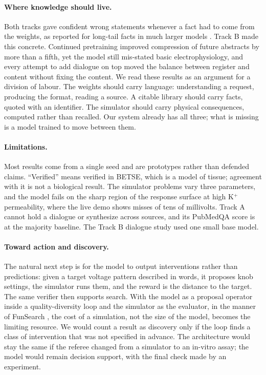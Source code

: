 \documentclass[11pt]{article}
\begin{document}
\paragraph{Where knowledge should live.} Both tracks gave confident wrong
statements whenever a fact had to come from the weights, as reported for
long-tail facts in much larger models \citep{kandpal2023large,mallen2023when}.
Track B made this concrete. Continued pretraining improved compression of
future abstracts by more than a fifth, yet the model still mis-stated basic
electrophysiology, and every attempt to add dialogue on top moved the
balance between register and content without fixing the content. We read
these results as an argument for a division of labour. The weights should
carry language: understanding a request, producing the format,
reading a source. A citable library should carry facts, quoted with an
identifier. The simulator should carry physical consequences, computed
rather than recalled. Our system already has all three; what is missing is
a model trained to move between them.

\paragraph{Limitations.} Most results come from a single seed and are
prototypes rather than defended claims. ``Verified'' means verified in
BETSE, which is a model of tissue; agreement with it is not a biological
result. The simulator problems vary three parameters, and the model fails on the sharp region
of the response surface at high K$^+$ permeability, where the live demo
shows misses of tens of millivolts. Track A cannot hold a dialogue or
synthesize across sources, and its PubMedQA score is at the majority
baseline. The Track B dialogue study used one small base model.

\paragraph{Toward action and discovery.} The natural next step is for
the model to output interventions rather than predictions: given a target
voltage pattern described in words, it proposes knob settings, the
simulator runs them, and the reward is the distance to the target. The
same verifier then supports search. With the model as a proposal operator
inside a quality-diversity loop and the simulator as the evaluator, in the
manner of FunSearch \citep{romera2024mathematical}, the cost of a
simulation, not the size of the model, becomes the limiting resource. We
would count a result as discovery only if the loop finds a class of
intervention that was not specified in advance. The architecture would stay
the same if the referee changed from a simulator to an in-vitro assay;
the model would remain decision support, with the final check made by an experiment.
\end{document}
